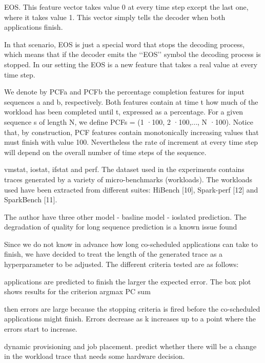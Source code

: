 \documentclass[8pt,UTF8]{article}
\begin{document}
                EOS. This feature vector takes value 0 at every time step except the last one, where it takes value 1. This vector simply tells the decoder when both applications finish.
                
                In that scenario, EOS is just a special word that stops the decoding process, which means that if the decoder emits the ‘‘EOS’’ symbol the decoding process is stopped. In our setting the EOS is a new feature that takes a real value at every time step.
                
                We denote by PCFa and PCFb the percentage completion features for input sequences a and b, respectively. Both features contain at time t how much of the workload has been completed until t, expressed as a percentage. For a given sequence s of length N, we define PCFs = (1 ·100, 2 ·100,..., N ·100). Notice that, by construction, PCF features contain monotonically increasing values that must finish with value 100. Nevertheless the rate of increment at every time step will depend on the overall number of time steps of the sequence.
                
                vmstat, iostat, ifstat and perf. The dataset used in the experiments contains traces generated by a variety of micro-benchmarks (workloads). The workloads used have been extracted from different suites: HiBench [10], Spark-perf [12] and SparkBench [11]. 
                
                The author have three other model - basline model - ioslated prediction. The degradation of quality for long sequence prediction is a known issue found
                
                Since we do not know in advance how long co-scheduled applications can take to finish, we have decided to treat the length of the generated trace as a hyperparameter to be adjusted. The different criteria tested are as follows:
                
                applications are predicted to finish the larger the expected error. The box plot shows results for the criterion argmax PC sum
                
                then errors are large because the stopping criteria is fired before the co-scheduled applications might finish. Errors decrease as k increases up to a point where the errors start to increase.
                
                dynamic provisioning and job placement. predict whether there will be a change in the workload trace that needs some hardware decision. 
                
\end{document}
